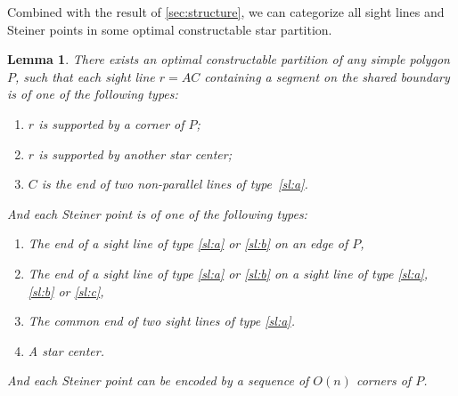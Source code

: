 \documentclass[10pt,a4paper]{article}
\newtheorem{lemma}{Lemma}[section]
\begin{document}
Combined with the result of \cref{sec:structure}, we can categorize all sight lines and Steiner points in some optimal constructable star partition. 
\begin{lemma}
    There exists an optimal constructable partition of any simple polygon $P$, such that each sight line $r = AC$ containing a segment on the shared boundary is of one of the following types: 
    \begin{enumerate}[label=(\alph*)]
        \item $r$ is supported by a corner of $P$; \label{sl:a}
        \item $r$ is supported by another star center; \label{sl:b}
        \item $C$ is the end of two non-parallel lines of type~\ref{sl:a}. \label{sl:c}
    \end{enumerate}
    
    And each Steiner point is of one of the following types:
    \begin{enumerate}[label=(\alph*)]
        \item The end of a sight line of type \ref{sl:a} or \ref{sl:b} on an edge of $P$, \label{st:a}
        \item The end of a sight line of type \ref{sl:a} or \ref{sl:b} on a sight line of type \ref{sl:a}, \ref{sl:b} or \ref{sl:c}, \label{st:b}
        \item The common end of two sight lines of type \ref{sl:a}. \label{st:c}
        \item
        A star center. \label{st:d}
    \end{enumerate}
    And each Steiner point can be encoded by a sequence of $O(n)$ corners of $P$. 
\end{lemma}
\end{document}
